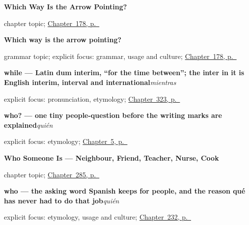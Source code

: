 \noindent\begin{minipage}[t]{\linewidth}
\raggedright
\textbf{Which Way Is the Arrow Pointing?}\par
\footnotesize chapter topic; \hyperref[ch:por-para-contrast]{Chapter~178, p.~\pageref*{ch:por-para-contrast}}
\end{minipage}\par\smallskip

\noindent\begin{minipage}[t]{\linewidth}
\raggedright
\textbf{Which way is the arrow pointing?}\par
\footnotesize grammar topic; explicit focus: grammar, usage and culture; \hyperref[ch:por-para-contrast]{Chapter~178, p.~\pageref*{ch:por-para-contrast}}
\end{minipage}\par\smallskip

\noindent\begin{minipage}[t]{\linewidth}
\raggedright
\textbf{while — Latin dum interim, \textquotedblleft{}for the time between\textquotedblright{}; the inter in it is English interim, interval and international}\enspace\emph{mientras}\par
\footnotesize explicit focus: pronunciation, etymology; \hyperref[ch:antes-y-despues]{Chapter~323, p.~\pageref*{ch:antes-y-despues}}
\end{minipage}\par\smallskip

\noindent\begin{minipage}[t]{\linewidth}
\raggedright
\textbf{who? — one tiny people-question before the writing marks are explained}\enspace\emph{quién}\par
\footnotesize explicit focus: etymology; \hyperref[ch:three-yous]{Chapter~5, p.~\pageref*{ch:three-yous}}
\end{minipage}\par\smallskip

\noindent\begin{minipage}[t]{\linewidth}
\raggedright
\textbf{Who Someone Is --- Neighbour, Friend, Teacher, Nurse, Cook}\par
\footnotesize chapter topic; \hyperref[ch:quien-es]{Chapter~285, p.~\pageref*{ch:quien-es}}
\end{minipage}\par\smallskip

\noindent\begin{minipage}[t]{\linewidth}
\raggedright
\textbf{who — the asking word Spanish keeps for people, and the reason qué has never had to do that job}\enspace\emph{quién}\par
\footnotesize explicit focus: etymology, usage and culture; \hyperref[ch:quien]{Chapter~232, p.~\pageref*{ch:quien}}
\end{minipage}\par\smallskip

